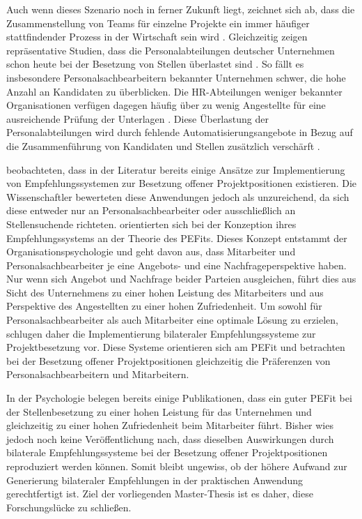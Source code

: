 Auch wenn dieses Szenario noch in ferner Zukunft liegt, zeichnet sich ab, dass die Zusammenstellung von Teams für einzelne Projekte ein immer häufiger stattfindender Prozess in der Wirtschaft sein wird \cite[S. 2]{malinowski:2008}. Gleichzeitig zeigen repräsentative Studien, dass die Personalabteilungen deutscher Unternehmen schon heute bei der Besetzung von Stellen überlastet sind \cite[S. 244]{personalbeschaffung:2017}. So fällt es insbesondere Personalsachbearbeitern bekannter Unternehmen schwer, die hohe Anzahl an Kandidaten zu überblicken. Die HR-Abteilungen weniger bekannter Organisationen verfügen dagegen häufig über zu wenig Angestellte für eine ausreichende Prüfung der Unterlagen \cite[S. 8]{hays:2013}. Diese Überlastung der Personalabteilungen wird durch fehlende Automatisierungsangebote in Bezug auf die Zusammenführung von Kandidaten und Stellen zusätzlich verschärft \cite[S. 15]{hays:2013}.

\textcite{malinowski:2008} beobachteten, dass in der Literatur bereits einige Ansätze zur Implementierung von Empfehlungssystemen zur Besetzung offener Projektpositionen existieren. Die Wissenschaftler bewerteten diese Anwendungen jedoch als unzureichend, da sich diese entweder nur an Personalsachbearbeiter oder ausschließlich an Stellensuchende richteten. \textcite{malinowski:2008} orientierten sich bei der Konzeption ihres Empfehlungssystems an der Theorie des \acp{PEFit}. Dieses Konzept entstammt der Organisationspsychologie und geht davon aus, dass Mitarbeiter und Personalsachbearbeiter je eine Angebots- und eine Nachfrageperspektive haben. Nur wenn sich Angebot und Nachfrage beider Parteien ausgleichen, führt dies aus Sicht des Unternehmens zu einer hohen Leistung des Mitarbeiters und aus Perspektive des Angestellten zu einer hohen Zufriedenheit. Um sowohl für Personalsachbearbeiter als auch Mitarbeiter eine optimale Lösung zu erzielen, schlugen \textcite{malinowski:2008} daher die Implementierung bilateraler Empfehlungssysteme zur Projektbesetzung vor. Diese Systeme orientieren sich am \ac{PEFit} und betrachten bei der Besetzung offener Projektpositionen gleichzeitig die Präferenzen von Personalsachbearbeitern und Mitarbeitern.

In der Psychologie belegen bereits einige Publikationen, dass ein guter \ac{PEFit} bei der Stellenbesetzung zu einer hohen Leistung für das Unternehmen und gleichzeitig zu einer hohen Zufriedenheit beim Mitarbeiter führt. Bisher wies jedoch noch keine Veröffentlichung nach, dass dieselben Auswirkungen durch bilaterale Empfehlungssysteme bei der Besetzung offener Projektpositionen reproduziert werden können. Somit bleibt ungewiss, ob der höhere Aufwand zur Generierung bilateraler Empfehlungen in der praktischen Anwendung gerechtfertigt ist. Ziel der vorliegenden Master-Thesis ist es daher, diese Forschungslücke zu schließen.

